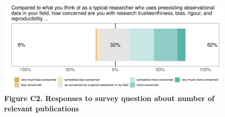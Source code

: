 \documentclass[
  man,floatsintext]{apa6}
\begin{document}
{\smaller[1]
\begin{singlespace}



\end{singlespace}
}

\begin{table}[H]

\caption{\label{tab:languageTable}\textbf{Table C1. ``What programming language or software do you use for your analyses of preexisting observational data? (you may select multiple answers)''}}
\end{table}

{\smaller[1]
\begin{singlespace}



\end{singlespace}
}

\begin{figure}

{\centering \includegraphics[width=1\linewidth]{figs/concernedPlot-1} 

}

\caption{\textbf{Figure C2. Responses to survey question about number of relevant publications}}\label{fig:concernedPlot}
\end{figure}
\end{document}
